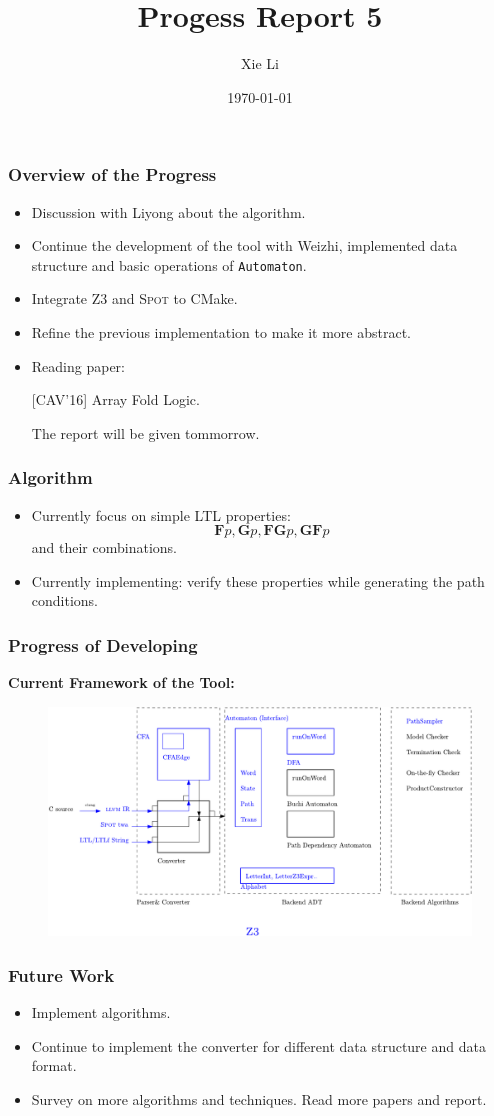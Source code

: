 \documentclass[11pt]{beamer}
\title{Progess Report 5}
\date{\today}
\author{Xie Li}
\begin{document}
\maketitle

\begin{frame}\frametitle{Overview of the Progress}
\begin{itemize}
\item Discussion with Liyong about the algorithm.
\item Continue the development of the tool with Weizhi, implemented  data structure and basic operations of \texttt{Automaton}.
\item Integrate \textsc{Z3} and \textsc{Spot} to CMake.
\item Refine the previous implementation to make it more abstract.
\item Reading paper: 

[CAV'16] Array Fold Logic.

The report will be given tommorrow.

\end{itemize}

\end{frame}

\begin{frame}\frametitle{Algorithm}
\begin{itemize}
\item Currently focus on simple LTL properties: 
\[\textbf{F}p, \textbf{G}p, \textbf{FG}p, \textbf{GF}p\]
and their combinations.

\item Currently implementing: verify these properties while generating the path conditions.
\end{itemize}

\end{frame}
\begin{frame}\frametitle{Progress of Developing}

\textbf{Current Framework of the Tool:}
\begin{figure}
\includegraphics[scale=0.5]{tool.pdf}
\end{figure}

\end{frame}

\begin{frame}\frametitle{Future Work}
\begin{itemize}

\item Implement algorithms.
\item Continue to implement the converter for different data structure and data format.
\item Survey on more algorithms and techniques. Read more papers and report.
\end{itemize}
\end{frame}
\end{document}
